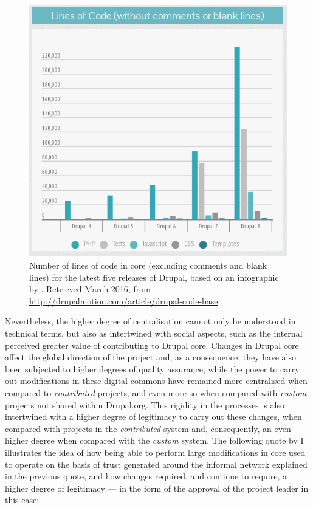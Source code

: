 \begin{figure}[H]
  \centering
   \includegraphics[scale=0.6]{graphs/lines_of_code_in_core}
   \caption[Number of lines of code in core per release]%
        {Number of lines of code in core (excluding comments and blank lines) for the latest five releases of Drupal, based on an infographic by \textcite{core-loc:2016:Online}. Retrieved  March 2016, from \url{http://drupalmotion.com/article/drupal-code-base}.}
\label{loc-core}
\end{figure}

Nevertheless, the higher degree of centralisation cannot only be understood in technical terms, but also as intertwined with social aspects, such as the internal perceived greater value of contributing to Drupal core. Changes in Drupal core affect the global direction of the project and, as a consequence, they have also been subjected to higher degrees of quality assurance, while the power to carry out modifications in these digital commons have remained more centralised when compared to \textit{contributed} projects, and even more so when compared with \textit{custom} projects not shared within Drupal.org. This rigidity in the processes is also intertwined with a higher degree of legitimacy to carry out these changes, when compared with projects in the \textit{contributed} system and, consequently, an even higher degree when compared with the \textit{custom} system. The following quote by I illustrates the idea of how being able to perform large modifications in core used to operate on the basis of trust generated around the informal network explained in the previous quote, and how changes required, and continue to require, a higher degree of legitimacy --- in the form of the approval of the project leader in this case:

